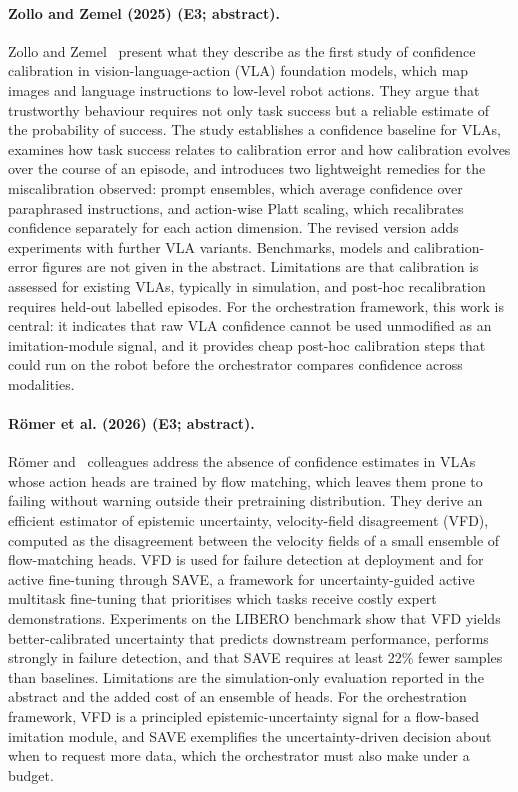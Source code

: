 \documentclass[10pt,a4paper]{article}
\begin{document}
\paragraph{Zollo and Zemel (2025) (E3; abstract).} Zollo and Zemel~\cite{Zollo2025} present what they describe as the first study of confidence calibration in vision-language-action (VLA) foundation models, which map images and language instructions to low-level robot actions. They argue that trustworthy behaviour requires not only task success but a reliable estimate of the probability of success. The study establishes a confidence baseline for VLAs, examines how task success relates to calibration error and how calibration evolves over the course of an episode, and introduces two lightweight remedies for the miscalibration observed: prompt ensembles, which average confidence over paraphrased instructions, and action-wise Platt scaling, which recalibrates confidence separately for each action dimension. The revised version adds experiments with further VLA variants. Benchmarks, models and calibration-error figures are not given in the abstract. Limitations are that calibration is assessed for existing VLAs, typically in simulation, and post-hoc recalibration requires held-out labelled episodes. For the orchestration framework, this work is central: it indicates that raw VLA confidence cannot be used unmodified as an imitation-module signal, and it provides cheap post-hoc calibration steps that could run on the robot before the orchestrator compares confidence across modalities.

\paragraph{R\"omer et al. (2026) (E3; abstract).} R\"omer and~\cite{Romer2026a} colleagues address the absence of confidence estimates in VLAs whose action heads are trained by flow matching, which leaves them prone to failing without warning outside their pretraining distribution. They derive an efficient estimator of epistemic uncertainty, velocity-field disagreement (VFD), computed as the disagreement between the velocity fields of a small ensemble of flow-matching heads. VFD is used for failure detection at deployment and for active fine-tuning through SAVE, a framework for uncertainty-guided active multitask fine-tuning that prioritises which tasks receive costly expert demonstrations. Experiments on the LIBERO benchmark show that VFD yields better-calibrated uncertainty that predicts downstream performance, performs strongly in failure detection, and that SAVE requires at least 22\% fewer samples than baselines. Limitations are the simulation-only evaluation reported in the abstract and the added cost of an ensemble of heads. For the orchestration framework, VFD is a principled epistemic-uncertainty signal for a flow-based imitation module, and SAVE exemplifies the uncertainty-driven decision about when to request more data, which the orchestrator must also make under a budget.
\end{document}
